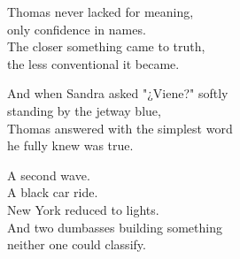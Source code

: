 \begin{lyrics}
Thomas never lacked for meaning,\\
only confidence in names.\\
The closer something came to truth,\\
the less conventional it became.

And when Sandra asked "¿Viene?" softly\\
standing by the jetway blue,\\
Thomas answered with the simplest word\\
he fully knew was true.

A second wave.\\
A black car ride.\\
New York reduced to lights.\\
And two dumbasses building something\\
neither one could classify.

\end{lyrics}


